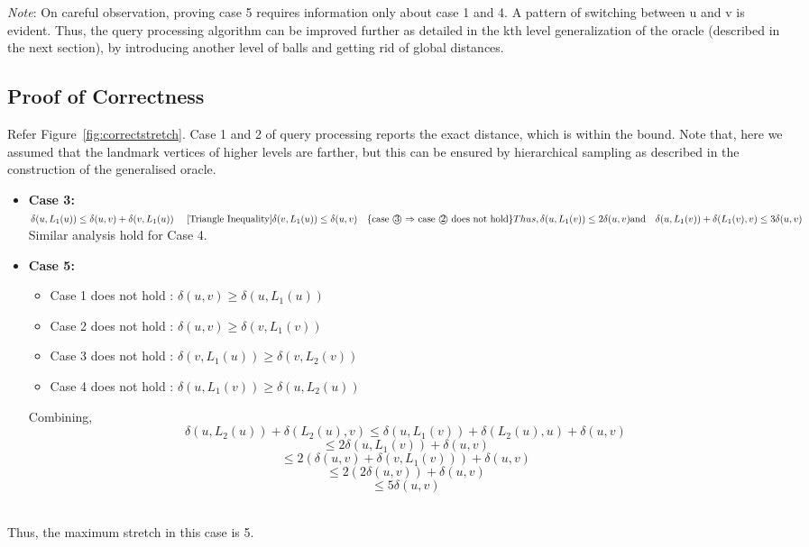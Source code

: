 \documentclass{article}
\begin{document}
\noindent \emph{Note}: On careful observation, proving case 5 requires information only about case 1 and 4. A pattern of switching between u and v is evident. Thus, the query processing algorithm can be improved further as detailed in the kth level generalization of the oracle (described in the next section), by introducing another level of balls and getting rid of global distances.
\subsection{Proof of Correctness}
Refer Figure~\ref{fig:correctstretch}. Case 1 and 2 of query processing reports the exact distance, which is within the bound. Note that, here we assumed that the landmark vertices of higher levels are farther, but this can be ensured by hierarchical sampling as described in the construction of the generalised oracle.
\begin{itemize}
    \item \textbf{Case 3:} \(\delta(u, L_1(u)) \leq \delta(u, v) + \delta(v, L_1(u))\quad \text{ [Triangle Inequality]}\\
    \delta(v, L_1(u)) \leq \delta(u, v) \quad \text{\{case \textcircled{3} $\Rightarrow$ case \textcircled{2} does not hold\}} \\
    Thus,  \delta(u, L_1(v)) \leq 2\delta(u, v) \\
    \text{and} \quad \delta(u, L_1(v)) + \delta(L_1(v), v) \leq 3\delta(u, v)\) \\
    Similar analysis hold for Case 4. 
    \item \textbf{Case 5:} 
\begin{itemize}
    \item Case 1 does not hold : $\delta(u,v) \geq \delta(u, L_1(u))$
    \item Case 2 does not hold : $\delta(u,v) \geq \delta(v, L_1(v))$
    \item Case 3 does not hold : $\delta(v, L_1(u)) \geq \delta(v, L_2(v))$
    \item Case 4 does not hold : $\delta(u, L_1(v)) \geq \delta(u, L_2(u))$
\end{itemize}

Combining,\[
\delta(u, L_2(u)) + \delta(L_2(u), v) 
\leq \delta(u, L_1(v)) + \delta(L_2(u), u) + \delta(u, v) \] 
\[\leq 2\delta(u, L_1(v)) + \delta(u, v) \]
\[\leq 2(\delta(u,v) + \delta(v, L_1(v))) + \delta(u, v)\] 
\[\leq 2(2\delta(u,v)) + \delta(u, v)\]
\[\leq 5\delta(u, v)\]\\
\end{itemize} 
Thus, the maximum stretch in this case is 5. 
\end{document}
